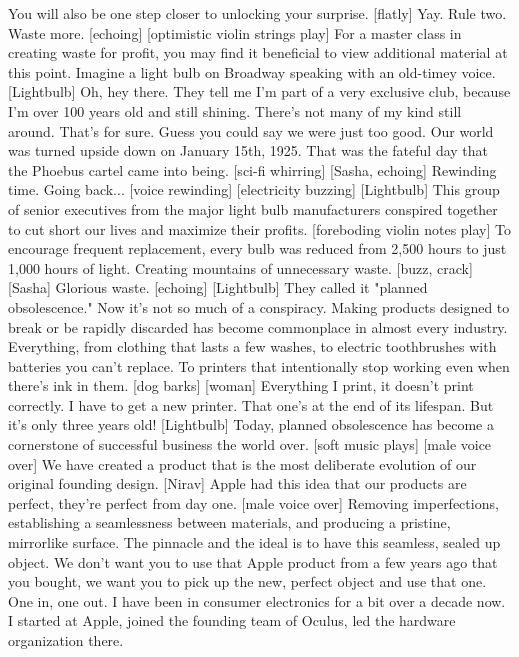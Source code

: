 \documentclass[a4paper]{article}
\begin{document}
	You will also be one step closer to unlocking your surprise.
	[flatly] Yay.
	Rule two.
	Waste more. [echoing]
	[optimistic violin strings play]
	For a master class in creating waste for profit,
	you may find it beneficial to view additional material at this point.
	Imagine a light bulb on Broadway speaking with an old-timey voice.
	[Lightbulb] Oh, hey there.
	They tell me I'm part of a very exclusive club,
	because I'm over 100 years old and still shining.
	There's not many of my kind still around. That's for sure.
	Guess you could say we were just too good.
	Our world was turned upside down on January 15th, 1925.
	That was the fateful day that the Phoebus cartel came into being.
	[sci-fi whirring]
	[Sasha, echoing] Rewinding time.
	Going back...
	[voice rewinding]
	[electricity buzzing]
	[Lightbulb] This group of senior executives
	from the major light bulb manufacturers
	conspired together to cut short our lives and maximize their profits.
	[foreboding violin notes play]
	To encourage frequent replacement,
	every bulb was reduced from 2,500 hours
	to just 1,000 hours of light.
	Creating mountains of unnecessary waste.
	[buzz, crack]
	[Sasha] Glorious waste. [echoing]
	[Lightbulb] They called it "planned obsolescence."
	Now it's not so much of a conspiracy.
	Making products designed to break or be rapidly discarded
	has become commonplace in almost every industry.
	Everything, from clothing that lasts a few washes,
	to electric toothbrushes with batteries you can't replace.
	To printers that intentionally stop working even when there's ink in them.
	[dog barks]
	[woman] Everything I print, it doesn't print correctly.
	I have to get a new printer. That one's at the end of its lifespan.
	But it's only three years old!
	[Lightbulb] Today, planned obsolescence has become
	a cornerstone of successful business the world over.
	[soft music plays]
	[male voice over] We have created a product
	that is the most deliberate evolution of our original founding design.
	[Nirav] Apple had this idea that our products are perfect,
	they're perfect from day one.
	[male voice over] Removing imperfections, establishing a seamlessness
	between materials,
	and producing a pristine, mirrorlike surface.
	The pinnacle and the ideal is to have this seamless, sealed up object.
	We don't want you to use that Apple product from a few years ago
	that you bought,
	we want you to pick up the new, perfect object and use that one.
	One in, one out.
	I have been in consumer electronics for a bit over a decade now.
	I started at Apple,
	joined the founding team of Oculus, led the hardware organization there.
\end{document}
